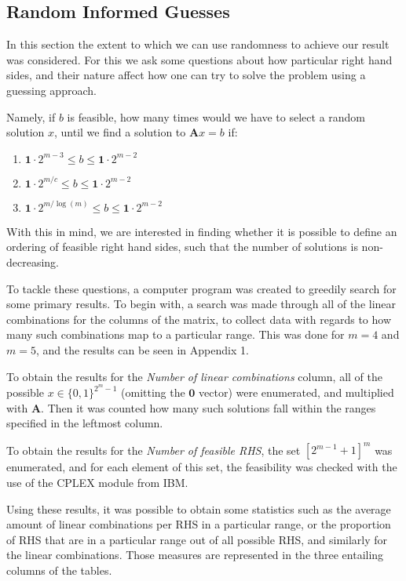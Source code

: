 \documentclass{article}
\begin{document}
\subsection{Random Informed Guesses}
In this section the extent to which we can use randomness to achieve our result was considered. For this we ask some questions about how particular right hand sides, and their nature affect how one can try to solve the problem using a guessing approach.

Namely, if $b$ is feasible, how many times would we have to select a random solution $x$, until we find a solution to $\mathbf{A}x = b$ if:
\begin{enumerate}
    \item $\mathbf{1}\cdot 2^{m-3} \leq b \leq \mathbf{1}\cdot 2^{m-2} $
    \item $\mathbf{1}\cdot 2^{m/c} \leq b \leq \mathbf{1}\cdot 2^{m-2} $
    \item $\mathbf{1}\cdot 2^{m/\log(m)} \leq b \leq \mathbf{1}\cdot 2^{m-2} $
\end{enumerate}
With this in mind, we are interested in finding whether it is possible to define an ordering of feasible right hand sides, such that the number of solutions is non-decreasing. 

To tackle these questions, a computer program was created\footnotemark{} to greedily search for some primary results. To begin with, a search was made through all of the linear combinations for the columns of the matrix, to collect data with regards to how many such combinations map to a particular range. This was done for $m=4$ and $m=5$, and the results can be seen in Appendix 1.

To obtain the results for the \textit{Number of linear combinations} column, all of the possible $x \in \{0,1\}^{2^m - 1}$ (omitting the $\mathbf{0}$ vector) were enumerated, and multiplied with $\mathbf{A}$. Then it was counted how many such solutions fall within the ranges specified in the leftmost column. 

To obtain the results for the \textit{Number of feasible RHS}, the set $\left[2^{m-1}+1\right] ^m$ was enumerated, and for each element of this set, the feasibility was checked with the use of the CPLEX module from IBM. 

Using these results, it was possible to obtain some statistics such as the average amount of linear combinations per RHS in a particular range, or the proportion of RHS that are in a particular range out of all possible RHS, and similarly for the linear combinations. Those measures are represented in the three entailing columns of the tables. 
\end{document}
